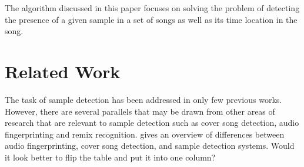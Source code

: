 \documentclass{article}
\begin{document}
The algorithm discussed in this paper focuses on solving the problem of detecting the presence of a given sample in a set of songs as well as its time location in the song.

%
\section{Related Work}
\label{related}
The task of sample detection has been addressed in only few previous works. However, there are several parallels that may be drawn from other areas of research that are relevant to sample detection such as cover song detection, audio fingerprinting and remix recognition.  gives an overview of differences between audio fingerprinting, cover song detection, and sample detection systems. {\color{red}Would it look better to flip the table and put it into one column?}
\end{document}
